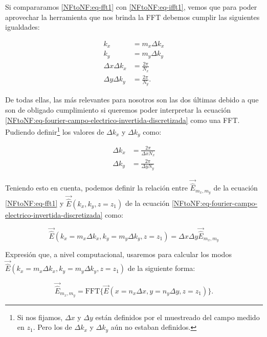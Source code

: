 \documentclass{article}
\begin{document}
Si compararamos  \eqref{NFtoNF:eq-fft1} con \eqref{NFtoNF:eq-ifft1}, vemos que para
poder aprovechar la herramienta que nos brinda la FFT debemos cumplir las siguientes igualdades:

\begin{subequations}
\begin{align}
k_{x}&= m_{x}\Delta k_{x}
\\
k_{y}&= m_{y}\Delta k_{y}
\\
\Delta x \Delta k_{x}&=\frac{2\pi}{N_{x}}
\\
\Delta y \Delta k_{y}&=\frac{2\pi}{N_{y}}.
\end{align}
\end{subequations}

\newpage

De todas ellas, las más relevantes para nosotros son las dos últimas debido a que son de obligado cumplimiento si queremos poder interpretar la ecuación \eqref{NFtoNF:eq-fourier-campo-electrico-invertida-discretizada} como
una FFT. Pudiendo definir\footnote{Si nos fijamos, $\Delta x$ y $\Delta y$ están
definidos por el muestreado del campo medido en $z_1$. Pero los de $\Delta k_{x}$ y $\Delta k_{y}$ aún no estaban definidos.} los valores de $\Delta k_{x}$ y
$\Delta k_{y}$ como:

\begin{align}
\Delta k_{x}&=\frac{2\pi}{\Delta x N_{x}}
\\
\Delta k_{y}&=\frac{2\pi}{\Delta y N_{y}}
\end{align}

Teniendo esto en cuenta, podemos definir la relación entre 
$\vec{\hat{E}}_{m_{x},m_{y}}$ de la ecuación \eqref{NFtoNF:eq-fft1} y 
$\vec{\hat{E}}(k_{x},k_{y},z=z_{1})$ de la ecuación \eqref{NFtoNF:eq-fourier-campo-electrico-invertida-discretizada} como:

\begin{equation}
\vec{\hat{E}}(k_{x}=m_{x} \Delta k_{x},k_{y}=m_{y} \Delta
k_{y},z=z_{1})= \Delta x \Delta y\vec{\hat{E}}_{m_{x},m_{y}}
\end{equation}

Expresión que, a nivel computacional, usaremos para calcular los modos $\vec{\hat{E}}(k_{x}=m_{x} \Delta k_{x},k_{y}=m_{y} \Delta
k_{y},z=z_{1})$ de la siguiente forma:

\begin{equation}
\vec{\hat{E}}_{m_{x},m_{y}}=\mbox{FFT}\{\vec{E}(x=n_{x}\Delta
x,y=n_{y} \Delta y,z=z_{1})\}.
\label{NFtoNF:eq-FFT-del-campo}
\end{equation}
\end{document}
